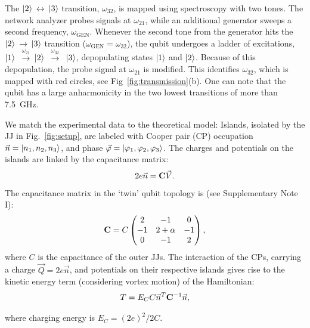 \documentclass[%
reprint,
superscriptaddress,
bibnotes,
amsmath,
amssymb,
aps,
showkeys,
prb,
]{revtex4-1}
\newcommand{\iket}[1]{\ensuremath{\Ket{#1}}}
\newcommand{\ira}{\ensuremath{\,\rightarrow\,}}
\newcommand{\ilra}{\ensuremath{\,\leftrightarrow\,}}
\newcommand{\iratext}[1]{\ensuremath{\,\xrightarrow{\text{#1}}\,}}
\begin{document}
{The  \iket{2}\ilra\iket{3}  transition,  $\omega_{32}$,   is  mapped  using
spectroscopy with two tones. The network  analyzer probes  signals at  $ \omega_{21}  $, while  an
additional generator  sweeps a second  frequency, $ \omega_{\text{GEN}}  $.  Whenever
the second tone from the generator hits the \iket{2}\ira\iket{3} transition
($\omega_{\text{GEN}}  = \omega_{32}  $), the  qubit  undergoes a  ladder of  excitations,
\iket{1}  \iratext{$\omega_{21}$}\iket{2}  \iratext{$\omega_{32}$} \iket{3},  depopulating
states \iket{1} and \iket{2}.  Because of this depopulation, the probe signal at $\omega_{21}$ is
modified.
This identifies  $\omega_{32}$, which  is mapped  with red  circles, see Fig~\ref{fig:transmission}(b).
One can note that the qubit has a large anharmonicity in the two lowest transitions of more than 7.5~GHz.

We match the  experimental data to the theoretical model: Islands,  isolated by the
JJ  in  Fig.~\ref{fig:setup},  are  labeled with  Cooper  pair  (CP)  occupation
$       \vec{n}      =       \iket{n_1,      n_2,       n_3}      $,       and phase
$     \vec{\varphi}     =     \iket{\varphi_1,     \varphi_2,     \varphi_3}     $.  The charges and potentials on
the islands are linked by the capacitance matrix:
\begin{equation}
  \label{eq:link}
  2e\vec{n} = \bold{C}\vec{V}.
\end{equation}
The capacitance matrix in the `twin' qubit topology is (see Supplementary Note I):
\begin{equation}
  \bold{C} = C \begin{pmatrix}
    2  &  -1  &  0\\
    -1  &  2  +  \alpha  &  -1\\
    0  &  -1  & 2
  \end{pmatrix},
  \label{eq:capac}
\end{equation}
where $C$  is the capacitance of the outer  JJs.  The interaction
of the  CPs, carrying a  charge $ \vec{Q}=2e\vec{n}  $, and potentials  on their
respective islands gives rise to the kinetic energy term (considering vortex motion) of the Hamiltonian:
\begin{equation}\label{eq:potential}
  \begin{aligned}
    T = E_C C \vec{n}^{T}\bold{C}^{-1}\vec{n},
  \end{aligned}
\end{equation}

\noindent where charging energy is $ E_{C}={(2e)^{2}}/{2 C } $.

}
\end{document}

